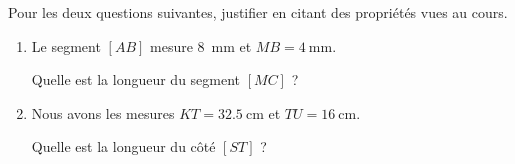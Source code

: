 
\begin{exercice}\label{exo2smath-0314}

    Pour les deux questions suivantes, justifier en citant des propriétés vues au cours.

    \begin{multicols}{2}
        \begin{enumerate}
            \item
                Le segment \( [AB]\) mesure \SI{8}{\milli\meter} et \( MB=\SI{4}{\milli\meter}\). 

\begin{center}
   
\end{center}

Quelle est la longueur du segment \( [MC]\) ?
\columnbreak

\item
    Nous avons les mesures \( KT=\SI{32.5}{\centi\meter}\) et \( TU=\SI{16}{\centi\meter}\).
\begin{center}
   
\end{center}
Quelle est la longueur du côté \( [ST]\) ?


        \end{enumerate}
    \end{multicols}
   

\end{exercice}
